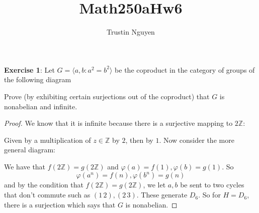 \documentclass{article}
\title{Math250aHw6}
\author{Trustin Nguyen}
\begin{document}
    \maketitle

\reversemarginpar

\textbf{Exercise 1}: Let $G = \langle a, b : a^{2} = b^{2} \rangle$ be the coproduct in the category of groups of the following diagram
    \begin{center}
    \end{center}
Prove (by exhibiting certain surjections out of the coproduct) that $G$ is nonabelian and infinite.
    \begin{proof}
        We know that it is infinite because there is a surjective mapping to $2\mathbb{Z}$:
            \begin{center}
            \end{center}
        Given by a multiplication of $z \in \mathbb{Z}$ by $2$, then by $1$. Now consider the more general diagram:
            \begin{center}
            \end{center}
        We have that $f(2\mathbb{Z}) = g(2\mathbb{Z})$ and $\varphi(a) = f(1), \varphi(b) = g(1)$. So 
            \begin{equation*}
                \varphi(a^{n}) = f(n), \varphi(b^{n}) = g(n)
            \end{equation*}
        and by the condition that $f(2\mathbb{Z}) = g(2\mathbb{Z})$, we let $a, b$ be sent to two cycles that don't commute such as $(1 \, 2), (2 \, 3)$. These generate $D_{6}$. So for $H = D_{6}$, there is a surjection which says that $G$ is nonabelian.
    \end{proof}
\end{document}
